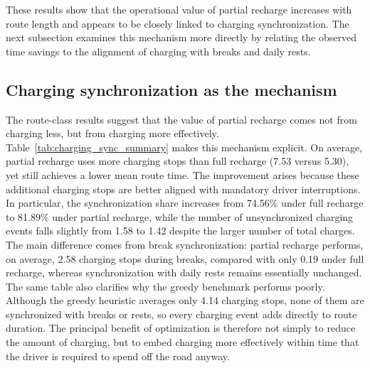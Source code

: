 \documentclass[3p,11pt,authoryear]{elsarticle}  %
\begin{document}
These results show that the operational value of partial recharge increases with route length and appears to be closely linked to charging synchronization. The next subsection examines this mechanism more directly by relating the observed time savings to the alignment of charging with breaks and daily rests.


\subsection{Charging synchronization as the mechanism}

The route-class results suggest that the value of partial recharge comes not from charging less, but from charging more effectively. Table~\ref{tab:charging_sync_summary} makes this mechanism explicit. On average, partial recharge uses more charging stops than full recharge (7.53 versus 5.30), yet still achieves a lower mean route time. The improvement arises because these additional charging stops are better aligned with mandatory driver interruptions. In particular, the synchronization share increases from 74.56\% under full recharge to 81.89\% under partial recharge, while the number of unsynchronized charging events falls slightly from 1.58 to 1.42 despite the larger number of total charges. The main difference comes from break synchronization: partial recharge performs, on average, 2.58 charging stops during breaks, compared with only 0.19 under full recharge, whereas synchronization with daily rests remains essentially unchanged. The same table also clarifies why the greedy benchmark performs poorly. Although the greedy heuristic averages only 4.14 charging stops, none of them are synchronized with breaks or rests, so every charging event adds directly to route duration. The principal benefit of optimization is therefore not simply to reduce the amount of charging, but to embed charging more effectively within time that the driver is required to spend off the road anyway.
\end{document}
